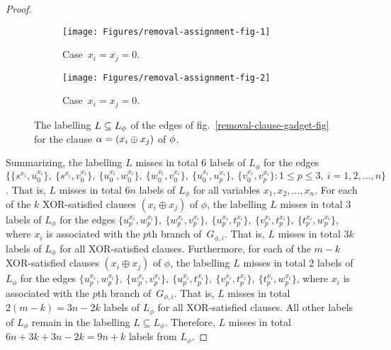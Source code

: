 \documentclass[a4paper,UKenglish]{article}
\begin{document}
\begin{proof}
\begin{figure}[tbh]
\centering
\begin{subfigure}[t]{.99\linewidth}
\centering \texttt{[image: Figures/removal-assignment-fig-1]} \hspace{0,2cm}
\caption{Case~$x_{i}=\overline{x_{j}}=0$.}
\label{removal-assignment-fig-1}
\end{subfigure}

\begin{subfigure}[b]{.99\linewidth}
\centering \texttt{[image: Figures/removal-assignment-fig-2]}
\caption{Case~$x_{i}=x_{j}=0$.}
\label{removal-assignment-fig-2}
\end{subfigure}

\caption{The labelling $\protect L \subseteq \protect L_{\protect \phi}$ of the edges of fig.~\protect\ref{removal-clause-gadget-fig} for
the clause $\protect\alpha =(x_{i}\oplus x_{j})$ of $\protect\phi$.}
\label{removal-assignment-fig}
\end{figure}

Summarizing, the labelling $L $ misses in total $6$ labels of $L _{\phi }$ for the edges $\{     \{  s^{x_{i}}  ,  u_{0}^{x_{i}}  \}  ,\   \{  s^{x_{i}}  ,  v_{0}^{x_{i}}  \}  ,\
  \{  u_{0}^{x_{i}}  ,  w_{0}^{x_{i}}  \}  ,\   \{  w_{0}^{x_{i}}  ,  v_{0}^{x_{i}}  \}  ,\
  \{  u_{0}^{x_{i}}  ,  u_{p}^{x_{i}}  \}  ,\   \{  v_{0}^{x_{i}}  ,  v_{p}^{x_{i}}  \}  :1\leq p\leq 3,~ i = 1,2,\ldots ,n \}$.
That is, $L $ misses in total $6n$ labels of $L _{\phi }$ for
all variables $x_{1},x_{2},\ldots ,x_{n}$. For each of the $k$ XOR-satisfied
clauses $(x_{i}\oplus x_{j})$ of $\phi $, the labelling $L $ misses in
total $3$ labels of $L _{\phi }$ for the edges $\{  u_{p}^{x_{i}}  ,  w_{p}^{x_{i}}  \}  ,\   \{  w_{p}^{x_{i}}  ,  v_{p}^{x_{i}}  \}  ,\
  \{  u_{p}^{x_{i}}  ,  t_{p}^{x_{i}}  \}  ,\   \{  v_{p}^{x_{i}}  ,  t_{p}^{x_{i}}  \}  ,\
  \{  t_{p}^{x_{i}}  ,  w_{p}^{x_{i}}  \} $, where $x_{i}$ is associated with the $p$th
branch of~$G_{\phi ,i}$. That is, $L $ misses in total $3k$ labels of $L _{\phi }$ for all XOR-satisfied clauses. Furthermore, for each of
the $m-k$ XOR-satisfied clauses $(x_{i}\oplus x_{j})$ of $\phi $, the
labelling $L $ misses in total $2$ labels of $L _{\phi }$ for the
edges $  \{  u_{p}^{x_{i}}  ,  w_{p}^{x_{i}}  \}  ,\   \{  w_{p}^{x_{i}}  ,  v_{p}^{x_{i}}  \}  ,\
  \{  u_{p}^{x_{i}}  ,  t_{p}^{x_{i}}  \}  ,\   \{  v_{p}^{x_{i}}  ,  t_{p}^{x_{i}}  \}  ,\
  \{  t_{p}^{x_{i}}  ,  w_{p}^{x_{i}}  \}  $, where $x_{i}$ is associated with the $p$th
branch of~$G_{\phi ,i}$. That is, $L $ misses in total $2(m-k)=3n-2k$
labels of $L _{\phi }$ for all XOR-satisfied clauses. All other labels
of $L _{\phi }$ remain in the labelling $L \subseteq L
_{\phi }$. Therefore, $L $ misses in total $6n+3k+3n-2k=9n+k$ labels
from $L _{\phi }$.





\end{proof}
\end{document}
